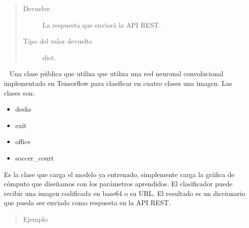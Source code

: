 \begin{fulllineitems}
\begin{fulllineitems}
\begin{fulllineitems}
\begin{quote}
\begin{description}
\begin{itemize}
\end{itemize}

\item[{Devuelve}] \leavevmode
La respuesta que enviará la API REST.

\item[{Tipo del valor devuelto}] \leavevmode
dict.

\end{description}\end{quote}

\end{fulllineitems}


\end{fulllineitems}

\label{\detokenize{chapter_two/desc_cloudnao:module-app.tf_models.indoor_scenes_classifier}}\label{\detokenize{chapter_two/desc_cloudnao:module-indoor_scenes_classifier}}

\begin{fulllineitems}
\label{\detokenize{chapter_two/desc_cloudnao:app.tf_models.indoor_scenes_classifier.ImageClassifier}}~
Una clase pública que utiliza que utiliza una red neuronal
convolucional implementada en Tensorflow para clasificar en cuatro
clases una imagen. Las clases son:
\begin{itemize}
\item {} 
desks

\item {} 
exit

\item {} 
office

\item {} 
soccer\_court

\end{itemize}

Es la clase que carga el modelo ya entrenado, simplemente carga
la gráfica de cómputo que diseñamos con los parámetros
aprendidos. El clasificador puede
recibir una imagen codificada en base64 o su URL. El resultado
es un diccionario que pueda ser enviado como respuesta en la API
REST.
\begin{quote}\begin{description}
\item[{Ejemplo}] \leavevmode
\end{description}\end{quote}


\end{fulllineitems}
\end{fulllineitems}
